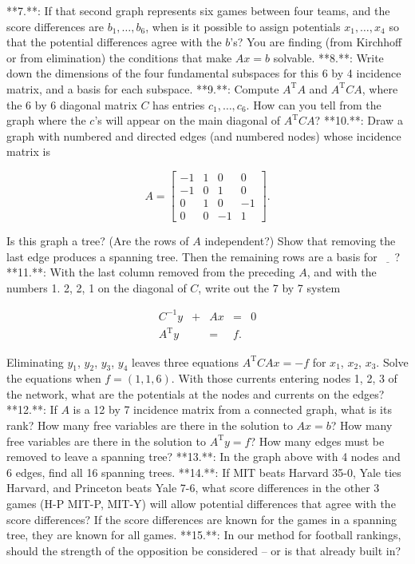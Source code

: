 

**7.**: If that second graph represents six games between four teams, and the score differences are \(b_{1},\ldots,b_{6}\), when is it possible to assign potentials \(x_{1},\ldots,x_{4}\) so that the potential differences agree with the \(b\)'s? You are finding (from Kirchhoff or from elimination) the conditions that make \(Ax=b\) solvable.
**8.**: Write down the dimensions of the four fundamental subspaces for this 6 by 4 incidence matrix, and a basis for each subspace.
**9.**: Compute \(A^{\mathrm{T}}A\) and \(A^{\mathrm{T}}CA\), where the 6 by 6 diagonal matrix \(C\) has entries \(c_{1},\ldots,c_{6}\). How can you tell from the graph where the \(c\)'s will appear on the main diagonal of \(A^{\mathrm{T}}CA\)?
**10.**: Draw a graph with numbered and directed edges (and numbered nodes) whose incidence matrix is

\[A=\begin{bmatrix}-1&1&0&0\\ -1&0&1&0\\ 0&1&0&-1\\ 0&0&-1&1\end{bmatrix}.\]

Is this graph a tree? (Are the rows of \(A\) independent?) Show that removing the last edge produces a spanning tree. Then the remaining rows are a basis for \(\underline{\phantom{-}}\)?
**11.**: With the last column removed from the preceding \(A\), and with the numbers 1. 2, 2, 1 on the diagonal of \(C\), write out the 7 by 7 system

\[\begin{array}{ccccl}C^{-1}y&+&Ax&=&0\\ A^{\mathrm{T}}y&&=&f.\end{array}\]

Eliminating \(y_{1}\), \(y_{2}\), \(y_{3}\), \(y_{4}\) leaves three equations \(A^{\mathrm{T}}CAx=-f\) for \(x_{1}\), \(x_{2}\), \(x_{3}\). Solve the equations when \(f=(1,1,6)\). With those currents entering nodes 1, 2, 3 of the network, what are the potentials at the nodes and currents on the edges?
**12.**: If \(A\) is a 12 by 7 incidence matrix from a connected graph, what is its rank? How many free variables are there in the solution to \(Ax=b\)? How many free variables are there in the solution to \(A^{\mathrm{T}}y=f\)? How many edges must be removed to leave a spanning tree?
**13.**: In the graph above with 4 nodes and 6 edges, find all 16 spanning trees.
**14.**: If MIT beats Harvard 35-0, Yale ties Harvard, and Princeton beats Yale 7-6, what score differences in the other 3 games (H-P MIT-P, MIT-Y) will allow potential differences that agree with the score differences? If the score differences are known for the games in a spanning tree, they are known for all games.
**15.**: In our method for football rankings, should the strength of the opposition be considered -- or is that already built in?